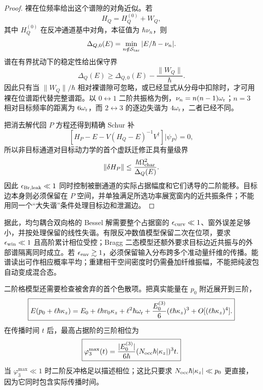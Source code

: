 \begin{proof}
裸在位频率给出这个谱隙的对角近似。若
\begin{equation*}
H_Q=H_Q^{(0)}+W_Q,
\end{equation*}
其中 $H_Q^{(0)}$ 在反冲通道基中对角，本征值为 $\hbar\nu_n$，则
\begin{equation*}
\Delta_{Q,0}(E)
=\min_{n\notin\mathcal S_{\rm tar}}|E/\hbar-\nu_n|.
\end{equation*}
谱在有界扰动下的稳定性给出保守界
\begin{equation*}
\Delta_Q(E)
\ge
\Delta_{Q,0}(E)-\frac{\|W_Q\|}{\hbar}.
\end{equation*}
因此只有当 $\|W_Q\|/\hbar$ 相对裸谱隙可忽略，或已经显式从分母中扣除时，才可用裸在位谱距代替完整谱距。以 $0\leftrightarrow1$ 二阶共振格为例，$\nu_n=n(n-1)\omega_{\rm r}$；$n=3$ 相对目标频率的距离为 $6\omega_{\rm r}$，而 $2\leftrightarrow3$ 的逐边失谐为 $4\omega_{\rm r}$，二者已经不同。

把消去解代回 $P$ 方程还得到精确 Schur 补
\begin{equation*}
\left[H_P-E-V(H_Q-E)^{-1}V^\dagger\right]|\psi_P\rangle=0,
\end{equation*}
所以非目标通道对目标动力学的首个虚跃迁修正具有量级界
\begin{equation*}
\|\delta H_P\|
\le
\frac{\hbar\Omega_{\rm char}^2}{\Delta_Q(E)}.
\end{equation*}
因此 $\epsilon_{\rm Br,leak}\ll1$ 同时控制被删通道的实际占据幅度和它们诱导的二阶能移。目标边本身则必须保留在 $P$ 空间，并单独满足所选功率展宽窗内的近共振条件；不能用同一个“大失谐”条件处理目标边和泄漏边。
\end{proof}


据此，均匀耦合双向格的 Bessel 解需要整个占据窗的 $\epsilon_{\rm curv}\ll1$、窗外误差足够小，并按处理保留的线性失谐。有限反冲数值模型保留二次在位项，要求 $\epsilon_{\rm win}\ll1$ 且高阶累计相位受控；Bragg 二态模型还额外要求目标边近共振与的外部谱隔离同时成立。若 $\epsilon_{\rm env}\gtrsim1$，必须保留输入分布跨多个准动量纤维的传播。能谱读出可作相应概率平均；重建相干空间密度时仍需叠加纤维振幅，不能把纯波包自动变成混合态。

二阶格模型还需要检查被舍弃的首个色散项。把真实能量在 $p_0$ 附近展开到三阶，
\begin{equation}
\boxed{
 E(p_0+\ell\hbar\kappa_z)
 =E_0+\ell\hbar v_0\kappa_z+\ell^2\hbar\omega_{\rm r}
 +\frac{E_0^{(3)}}{6}(\ell\hbar\kappa_z)^3+O[(\ell\hbar\kappa_z)^4].}
\label{eq:recoil_cubic_taylor_dp68}
\end{equation}
在传播时间 $t$ 后，最高占据阶的三阶相位为
\begin{equation}
\boxed{
 \varphi_3^{\max}(t)
 =\frac{|E_0^{(3)}|}{6\hbar}
 (N_{\rm occ}\hbar|\kappa_z|)^3t .}
\label{eq:cubic_phase_error_dp47}
\end{equation}
当 $\varphi_3^{\max}\ll1$ 时二阶反冲格足以描述相位；这比只要求 $N_{\rm occ}\hbar|\kappa_z|\ll p_0$ 更直接，因为它同时包含实际传播时间。

